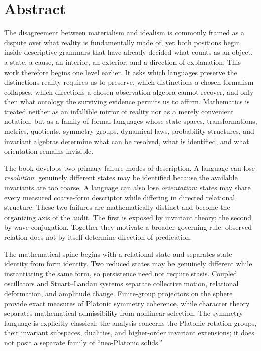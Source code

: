 \chapter*{Abstract}

The disagreement between materialism and idealism is commonly framed as a dispute over what reality is fundamentally made of, yet both positions begin inside descriptive grammars that have already decided what counts as an object, a state, a cause, an interior, an exterior, and a direction of explanation. This work therefore begins one level earlier. It asks which languages preserve the distinctions reality requires us to preserve, which distinctions a chosen formalism collapses, which directions a chosen observation algebra cannot recover, and only then what ontology the surviving evidence permits us to affirm. Mathematics is treated neither as an infallible mirror of reality nor as a merely convenient notation, but as a family of formal languages whose state spaces, transformations, metrics, quotients, symmetry groups, dynamical laws, probability structures, and invariant algebras determine what can be resolved, what is identified, and what orientation remains invisible.

The book develops two primary failure modes of description. A language can lose \emph{resolution}: genuinely different states may be identified because the available invariants are too coarse. A language can also lose \emph{orientation}: states may share every measured coarse-form descriptor while differing in directed relational structure. These two failures are mathematically distinct and become the organizing axis of the audit. The first is exposed by invariant theory; the second by wave conjugation. Together they motivate a broader governing rule: observed relation does not by itself determine direction of predication.

The mathematical spine begins with a relational state and separates state identity from form identity. Two reduced states may be genuinely different while instantiating the same form, so persistence need not require stasis. Coupled oscillators and Stuart--Landau systems separate collective motion, relational deformation, and amplitude change. Finite-group projectors on the sphere provide exact measures of Platonic symmetry coherence, while character theory separates mathematical admissibility from nonlinear selection. The symmetry language is explicitly classical: the analysis concerns the Platonic rotation groups, their invariant subspaces, dualities, and higher-order invariant extensions; it does not posit a separate family of ``neo-Platonic solids.''

